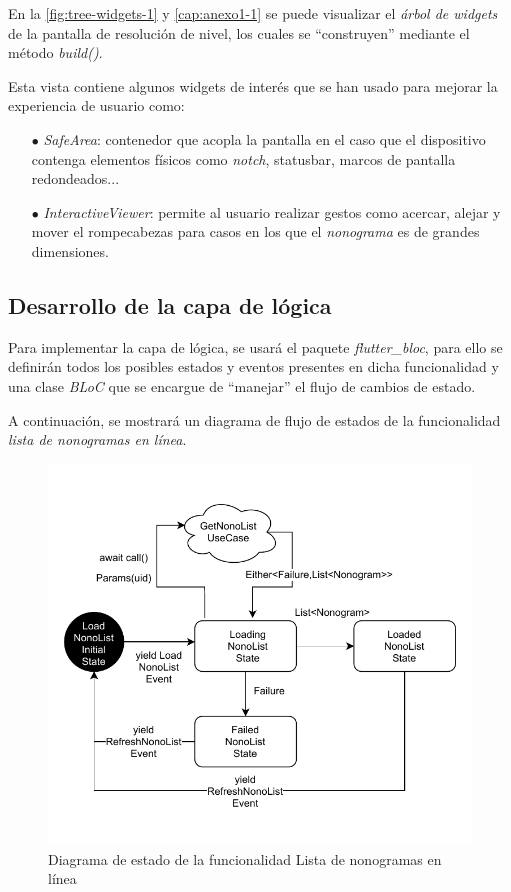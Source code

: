 En la \autoref{fig:tree-widgets-1} y \autoref{cap:anexo1-1} se puede visualizar el \textit{árbol de widgets} de la pantalla de resolución de nivel, los cuales
se ``construyen'' mediante el método \textit{build()}.

Esta vista contiene algunos widgets de interés que se han usado para mejorar la experiencia de usuario como:
\begin{itemize}
  \item[$\bullet$] \textit{SafeArea}: contenedor que acopla la pantalla en el caso que el dispositivo contenga elementos físicos como \textit{notch}, 
  statusbar, marcos de pantalla redondeados...
  \item[$\bullet$] \textit{InteractiveViewer}: permite al usuario realizar gestos como acercar, alejar y mover el rompecabezas 
  para casos en los que el \textit{nonograma} es de grandes dimensiones. 
\end{itemize}

\subsection{Desarrollo de la capa de lógica}
Para implementar la capa de lógica, se usará el paquete \textit{flutter\_bloc}, para ello se definirán todos los 
posibles estados y eventos presentes en dicha funcionalidad y una clase \textit{BLoC} que se encargue de 
``manejar'' el flujo de cambios de estado.

A continuación, se mostrará un diagrama de flujo de estados de la funcionalidad \textit{lista de nonogramas en línea}.

\begin{figure}[H]
  \centering
  \includegraphics[scale=0.83]{images/statesNonoList.pdf}
  \caption{Diagrama de estado de la funcionalidad Lista de nonogramas en línea}
  \label{fig:nonolist-states}
\end{figure}

